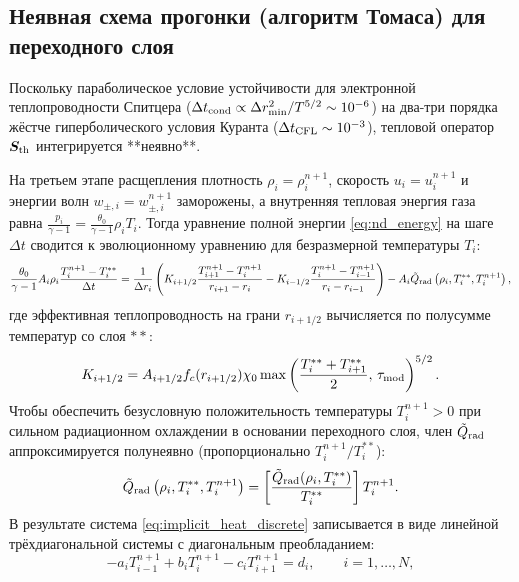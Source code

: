 \documentclass[11pt,a4paper]{article}
\begin{document}
\subsection{Неявная схема прогонки (алгоритм Томаса) для переходного слоя}

Поскольку параболическое условие устойчивости для электронной теплопроводности Спитцера ($\Delta t_{\rm cond} \propto \Delta r_{\min}^2 / T^{5/2} \sim 10^{-6}$) на два-три порядка жёстче гиперболического условия Куранта ($\Delta t_{\rm CFL} \sim 10^{-3}$), тепловой оператор $\bm{S}_{\rm th}$ интегрируется **неявно**.

На третьем этапе расщепления плотность $\rho_i = \rho_i^{n+1}$, скорость $u_i = u_i^{n+1}$ и энергии волн $w_{\pm,i} = w_{\pm,i}^{n+1}$ заморожены, а внутренняя тепловая энергия газа равна $\frac{p_i}{\gamma-1} = \frac{\theta_0}{\gamma-1}\rho_i T_i$. Тогда уравнение полной энергии \eqref{eq:nd_energy} на шаге $\Delta t$ сводится к эволюционному уравнению для безразмерной температуры $T_i$:
\begin{equation}
\frac{\theta_0}{\gamma-1}A_i\rho_i\frac{T_i^{n+1} - T_i^{**}}{\Delta t} = \frac{1}{\Delta r_i}\left(K_{i+1/2}\frac{T_{i+1}^{n+1} - T_i^{n+1}}{r_{i+1} - r_i} - K_{i-1/2}\frac{T_i^{n+1} - T_{i-1}^{n+1}}{r_i - r_{i-1}}\right) - A_i\tilde{Q}_{\rm rad}\left(\rho_i, T_i^{**}, T_i^{n+1}\right),
\label{eq:implicit_heat_discrete}
\end{equation}
где эффективная теплопроводность на грани $r_{i+1/2}$ вычисляется по полусумме температур со слоя $**$:
\begin{equation}
K_{i+1/2} = A_{i+1/2} f_c(r_{i+1/2}) \chi_0 \max\left(\frac{T_i^{**} + T_{i+1}^{**}}{2},\, \tau_{\rm mod}\right)^{5/2}.
\label{eq:K_face_def}
\end{equation}
Чтобы обеспечить безусловную положительность температуры $T_i^{n+1} > 0$ при сильном радиационном охлаждении в основании переходного слоя, член $\tilde{Q}_{\rm rad}$ аппроксимируется полунеявно (пропорционально $T_i^{n+1} / T_i^{**}$):
\begin{equation}
\tilde{Q}_{\rm rad}\left(\rho_i, T_i^{**}, T_i^{n+1}\right) = \left[\frac{\tilde{Q}_{\rm rad}(\rho_i, T_i^{**})}{T_i^{**}}\right] T_i^{n+1}.
\label{eq:qrad_semi_implicit}
\end{equation}
В результате система \eqref{eq:implicit_heat_discrete} записывается в виде линейной трёхдиагональной системы с диагональным преобладанием:
\begin{equation}
-a_i T_{i-1}^{n+1} + b_i T_i^{n+1} - c_i T_{i+1}^{n+1} = d_i, \qquad i = 1, \dots, N,
\label{eq:tridiagonal_system}
\end{equation}
\end{document}
